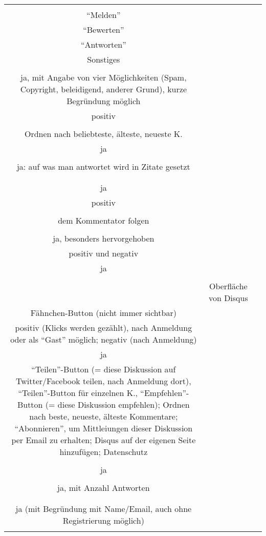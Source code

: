 \begin{landscape}
\begin{tabular}{ccc}
{{		
Funktionen im Kommentar	\\
``Melden''\\
``Bewerten''\\
``Antworten''\\
Sonstiges\\
&		%
		\\
		ja, mit Angabe von vier Möglichkeiten (Spam, Copyright, beleidigend, anderer Grund), kurze Begründung möglich\\
		positiv\\
		\\
		Ordnen nach beliebteste, älteste, neueste K.
		&
		\\
		ja\\
		\\
		ja: auf was man antwortet wird in Zitate gesetzt\\
		\\
		&
		\\
		ja\\
		positiv\\
		\\
		dem Kommentator folgen\\
		&
		\\
		ja, besonders hervorgehoben\\
		positiv und negativ\\
		ja\\
		\\
		&
		Oberfläche von Disqus\\
		Fähnchen-Button (nicht immer sichtbar)\\
		positiv (Klicks werden gezählt), nach Anmeldung oder als ``Gast'' möglich; negativ (nach Anmeldung)\\
		ja\\
		``Teilen''-Button (= diese Diskussion auf Twitter/Facebook teilen, nach Anmeldung dort), ``Teilen''-Button für einzelnen K., 		``Empfehlen''-Button (= diese Diskussion empfehlen); Ordnen nach beste, neueste, älteste Kommentare; ``Abonnieren'', um Mittleiungen dieser Diskussion per Email zu erhalten; Disqus auf der eigenen Seite hinzufügen; Datenschutz\\
		&
		\\
		ja\\
		\\
		ja, mit Anzahl Antworten\\
		\\
		&
		\\
		ja (mit Begründung mit Name/Email, auch ohne Registrierung möglich)\\
}}
\end{tabular}
\end{landscape}
